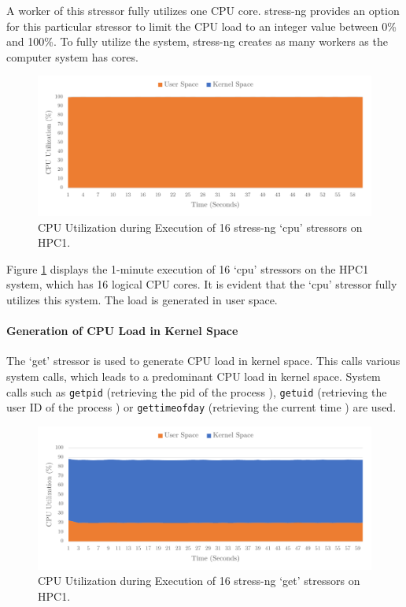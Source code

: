 A worker of this stressor fully utilizes one \ac{CPU} core. stress-ng provides an option for this particular stressor to limit the \ac{CPU} load to an integer value between 0\% and 100\%. To fully utilize the system, stress-ng creates as many workers as the computer system has cores.

\begin{figure}[h!]
    \centering
    \includegraphics[width=1\linewidth]{figures/method/stress1.pdf}
    \caption{\ac{CPU} Utilization during Execution of 16 stress-ng `cpu' stressors on HPC1.}
    \label{fig:stressCPU}
\end{figure}

Figure \ref{fig:stressCPU} displays the 1-minute execution of 16 `cpu' stressors on the HPC1 system, which has 16 logical \ac{CPU} cores. It is evident that the `cpu' stressor fully utilizes this system. The load is generated in user space.

\paragraph{Generation of CPU Load in Kernel Space}
The `get' stressor is used to generate \ac{CPU} load in kernel space. This calls various system calls, which leads to a predominant \ac{CPU} load in kernel space. System calls such as \texttt{getpid} (retrieving the \ac{pid} of the process \cite{stress06}), \texttt{getuid} (retrieving the user ID of the process \cite{stress07}) or \texttt{gettimeofday} (retrieving the current time \cite{stress08}) are used.

\begin{figure}[h!]
    \centering
    \includegraphics[width=1\linewidth]{figures/method/stress2.pdf}
    \caption{CPU Utilization during Execution of 16 stress-ng `get' stressors on HPC1.}
    \label{fig:stressGET}
\end{figure}

